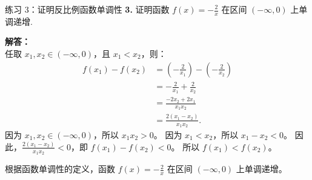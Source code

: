\documentclass[aspectratio=169, 10pt]{beamer}
\begin{document}
	\begin{frame}{练习 3：证明反比例函数单调性}
		\textbf{\textcolor{myblue}{3.}} 证明函数 \(f(x)=-\frac{2}{x}\) 在区间 \((-\infty, 0)\) 上单调递增.
		
		\vspace{0.5cm}
		\textbf{解答：}\\
		任取 \(x_1, x_2 \in (-\infty, 0)\)，且 \(x_1 < x_2\)，则：
		\begin{align*}
			f(x_1) - f(x_2) &= \left(-\frac{2}{x_1}\right) - \left(-\frac{2}{x_2}\right) \\
			&= -\frac{2}{x_1} + \frac{2}{x_2} \\
			&= \frac{-2x_2 + 2x_1}{x_1x_2} \\
			&= \frac{2(x_1 - x_2)}{x_1x_2}.
		\end{align*}
		因为 \(x_1, x_2 \in (-\infty, 0)\)，所以 \(x_1x_2 > 0\)。
		因为 \(x_1 < x_2\)，所以 \(x_1 - x_2 < 0\)。
		因此，\(\frac{2(x_1 - x_2)}{x_1x_2} < 0\)，即 \(f(x_1) - f(x_2) < 0\)。
		所以 \(f(x_1) < f(x_2)\)。
		
		根据函数单调性的定义，函数 \(f(x)=-\frac{2}{x}\) 在区间 \((-\infty, 0)\) 上单调递增。
	\end{frame}
	
\end{document}
